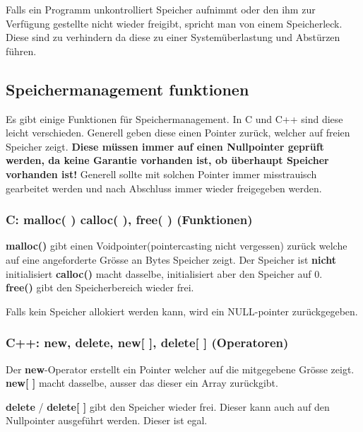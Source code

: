 Falls ein Programm unkontrolliert Speicher aufnimmt oder den ihm zur Verfügung gestellte nicht wieder freigibt, spricht man von einem Speicherleck. 
Diese sind zu verhindern da diese zu einer Systemüberlastung und Abstürzen führen.

\nextcol

\subsection{Speichermanagement funktionen}

Es gibt einige Funktionen für Speichermanagement. In C und C++ sind diese leicht verschieden. 
Generell geben diese einen Pointer zurück, welcher auf freien Speicher zeigt. 
\textbf{Diese müssen immer auf einen Nullpointer geprüft werden, da keine Garantie vorhanden ist, ob überhaupt Speicher vorhanden ist!}
Generell sollte mit solchen Pointer immer misstrauisch gearbeitet werden und nach Abschluss immer wieder freigegeben werden.

\subsubsection{C: malloc( ) calloc( ), free( ) (Funktionen)}

\textbf{malloc()} gibt einen Voidpointer(pointercasting nicht vergessen) zurück welche auf eine angeforderte Grösse an Bytes Speicher zeigt. 
Der Speicher ist \textbf{nicht} initialisiert
\textbf{calloc()} macht dasselbe, initialisiert aber den Speicher auf 0.\\
\textbf{free()} gibt den Speicherbereich wieder frei.



Falls kein Speicher allokiert werden kann, wird ein NULL-pointer zurückgegeben.

\subsubsection{C++: new, delete, new[ ], delete[ ] (Operatoren)}

Der \textbf{new}-Operator erstellt ein Pointer welcher auf die mitgegebene Grösse zeigt.
\textbf{new[ ]} macht dasselbe, ausser das dieser ein Array zurückgibt.

\textbf{delete} / \textbf{delete[ ]} gibt den Speicher wieder frei. 
Dieser kann auch auf den Nullpointer ausgeführt werden. 
Dieser ist  egal.



